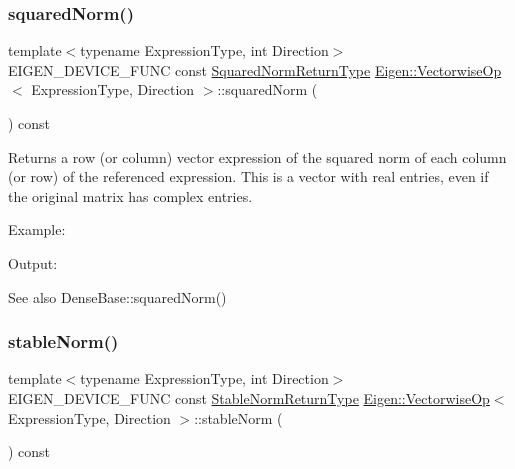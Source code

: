 \subsubsection{\texorpdfstring{squaredNorm()}{squaredNorm()}}
{\footnotesize\ttfamily template$<$typename Expression\+Type, int Direction$>$ \\
E\+I\+G\+E\+N\+\_\+\+D\+E\+V\+I\+C\+E\+\_\+\+F\+U\+NC const \mbox{\hyperlink{class_eigen_1_1_partial_redux_expr}{Squared\+Norm\+Return\+Type}} \mbox{\hyperlink{class_eigen_1_1_vectorwise_op}{Eigen\+::\+Vectorwise\+Op}}$<$ Expression\+Type, Direction $>$\+::squared\+Norm (\begin{DoxyParamCaption}{ }\end{DoxyParamCaption}) const\hspace{0.3cm}{\ttfamily [inline]}}

\begin{DoxyReturn}{Returns}
a row (or column) vector expression of the squared norm of each column (or row) of the referenced expression. This is a vector with real entries, even if the original matrix has complex entries.
\end{DoxyReturn}
Example\+: 
\begin{DoxyCodeInclude}{0}
\end{DoxyCodeInclude}
 Output\+: 
\begin{DoxyVerbInclude}
\end{DoxyVerbInclude}


\begin{DoxySeeAlso}{See also}
Dense\+Base\+::squared\+Norm() 
\end{DoxySeeAlso}
\mbox{\label{class_eigen_1_1_vectorwise_op_adfa17a946f1bd845b85cba8cf34732ac}} 
\subsubsection{\texorpdfstring{stableNorm()}{stableNorm()}}
{\footnotesize\ttfamily template$<$typename Expression\+Type, int Direction$>$ \\
E\+I\+G\+E\+N\+\_\+\+D\+E\+V\+I\+C\+E\+\_\+\+F\+U\+NC const \mbox{\hyperlink{class_eigen_1_1_partial_redux_expr}{Stable\+Norm\+Return\+Type}} \mbox{\hyperlink{class_eigen_1_1_vectorwise_op}{Eigen\+::\+Vectorwise\+Op}}$<$ Expression\+Type, Direction $>$\+::stable\+Norm (\begin{DoxyParamCaption}{ }\end{DoxyParamCaption}) const\hspace{0.3cm}{\ttfamily [inline]}}

